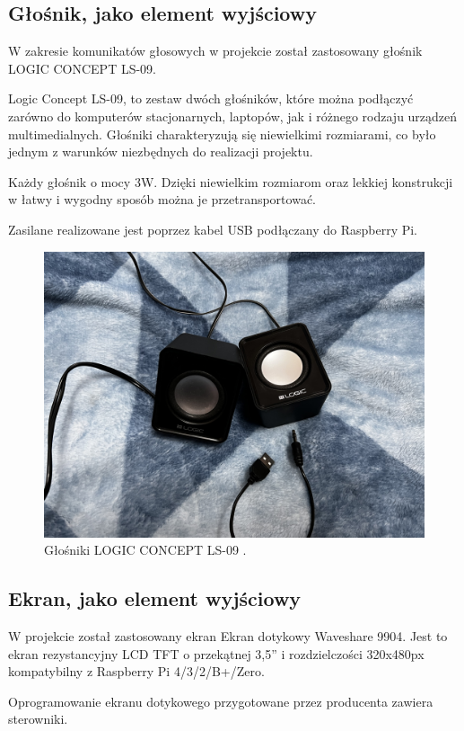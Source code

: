\documentclass[a4paper,12pt,reqno]{article}
\begin{document}
\subsection{Głośnik, jako element wyjściowy}

W zakresie komunikatów głosowych w projekcie został zastosowany głośnik LOGIC CONCEPT LS-09.

Logic Concept LS-09, to zestaw dwóch głośników, które można podłączyć zarówno do komputerów stacjonarnych, laptopów, jak i różnego rodzaju urządzeń multimedialnych. Głośniki charakteryzują się niewielkimi rozmiarami, co było jednym z warunków niezbędnych do realizacji projektu.

Każdy głośnik o mocy 3W. Dzięki niewielkim rozmiarom oraz lekkiej konstrukcji w łatwy i wygodny sposób można je przetransportować.

Zasilane realizowane jest poprzez kabel USB podłączany do Raspberry Pi.

\begin{figure}[H]%
\centering
\includegraphics[width=0.8\columnwidth]{imgs/glosnik.jpg}
\caption{Głośniki LOGIC CONCEPT LS-09 \cite{img_me}.  \label{glosnik}}
\quad
\end{figure}

\subsection{Ekran, jako element wyjściowy}

W projekcie został zastosowany ekran Ekran dotykowy Waveshare 9904. Jest to ekran rezystancyjny LCD TFT o przekątnej 3,5'' i rozdzielczości 320x480px kompatybilny z Raspberry Pi 4/3/2/B+/Zero.

Oprogramowanie ekranu dotykowego przygotowane przez producenta zawiera sterowniki.
\end{document}
